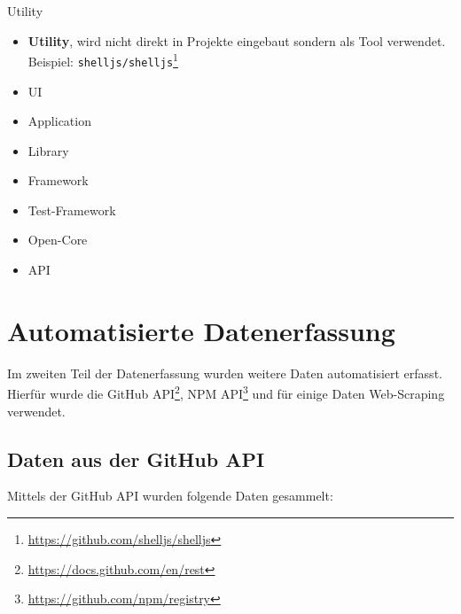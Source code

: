 Utility




\begin{itemize}[noitemsep]
    \item \textbf{Utility}, wird nicht direkt in Projekte eingebaut sondern als Tool verwendet.
          Beispiel: \texttt{shelljs/shelljs}\footnote{\url{https://github.com/shelljs/shelljs}}
    \item UI
    \item Application
    \item Library
    \item Framework
    \item Test-Framework
    \item Open-Core
    \item API
\end{itemize}








\section{Automatisierte Datenerfassung}\label{sec:automatisierte_datenerfassung}

Im zweiten Teil der Datenerfassung wurden weitere Daten automatisiert erfasst. Hierfür wurde die
GitHub API\footnote{\url{https://docs.github.com/en/rest}}, NPM
API\footnote{\url{https://github.com/npm/registry}} und für einige Daten Web-Scraping
verwendet.


\subsection{Daten aus der GitHub API}
Mittels der GitHub API wurden folgende Daten gesammelt:

